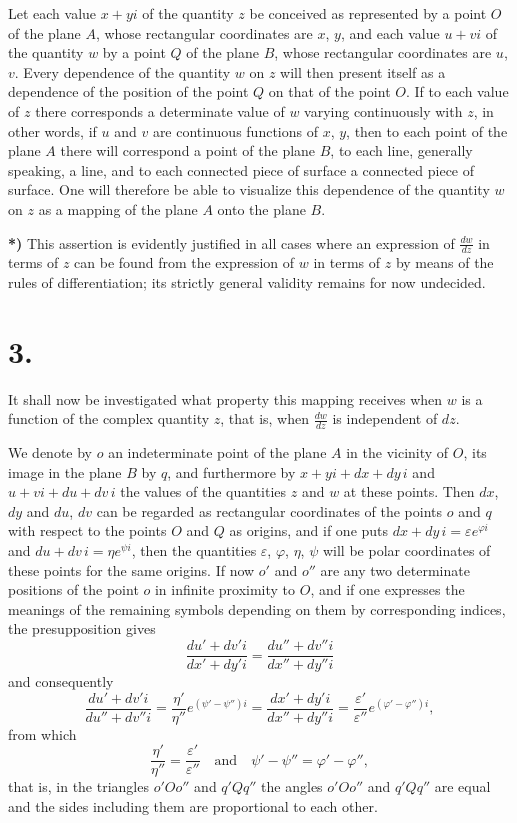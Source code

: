 \documentclass{article}
\begin{document}
Let each value $x + yi$ of the quantity $z$ be conceived as represented by a point $O$ of the plane $A$, whose rectangular coordinates are $x$, $y$, and each value $u + vi$ of the quantity $w$ by a point $Q$ of the plane $B$, whose rectangular coordinates are $u$, $v$. Every dependence of the quantity $w$ on $z$ will then present itself as a dependence of the position of the point $Q$ on that of the point $O$. If to each value of $z$ there corresponds a determinate value of $w$ varying continuously with $z$, in other words, if $u$ and $v$ are continuous functions of $x$, $y$, then to each point of the plane $A$ there will correspond a point of the plane $B$, to each line, generally speaking, a line, and to each connected piece of surface a connected piece of surface. One will therefore be able to visualize this dependence of the quantity $w$ on $z$ as a mapping of the plane $A$ onto the plane $B$.

\textbf{*)} This assertion is evidently justified in all cases where an expression of $\frac{dw}{dz}$ in terms of $z$ can be found from the expression of $w$ in terms of $z$ by means of the rules of differentiation; its strictly general validity remains for now undecided.

\section*{3.}

It shall now be investigated what property this mapping receives when $w$ is a function of the complex quantity $z$, that is, when $\frac{dw}{dz}$ is independent of $dz$.

We denote by $o$ an indeterminate point of the plane $A$ in the vicinity of $O$, its image in the plane $B$ by $q$, and furthermore by $x + yi + dx + dy\,i$ and $u + vi + du + dv\,i$ the values of the quantities $z$ and $w$ at these points. Then $dx$, $dy$ and $du$, $dv$ can be regarded as rectangular coordinates of the points $o$ and $q$ with respect to the points $O$ and $Q$ as origins, and if one puts $dx + dy\,i = \varepsilon e^{\varphi i}$ and $du + dv\,i = \eta e^{\psi i}$, then the quantities $\varepsilon$, $\varphi$, $\eta$, $\psi$ will be polar coordinates of these points for the same origins. If now $o'$ and $o''$ are any two determinate positions of the point $o$ in infinite proximity to $O$, and if one expresses the meanings of the remaining symbols depending on them by corresponding indices, the presupposition gives
\[
\frac{du' + dv'i}{dx' + dy'i} = \frac{du'' + dv''i}{dx'' + dy''i}
\]
and consequently
\[
\frac{du' + dv'i}{du'' + dv''i} = \frac{\eta'}{\eta''} e^{(\psi' - \psi'')i} = \frac{dx' + dy'i}{dx'' + dy''i} = \frac{\varepsilon'}{\varepsilon''} e^{(\varphi' - \varphi'')i},
\]
from which
\[
\frac{\eta'}{\eta''} = \frac{\varepsilon'}{\varepsilon''} \quad \text{and} \quad \psi' - \psi'' = \varphi' - \varphi'',
\]
that is, in the triangles $o'Oo''$ and $q'Qq''$ the angles $o'Oo''$ and $q'Qq''$ are equal and the sides including them are proportional to each other.
\end{document}
